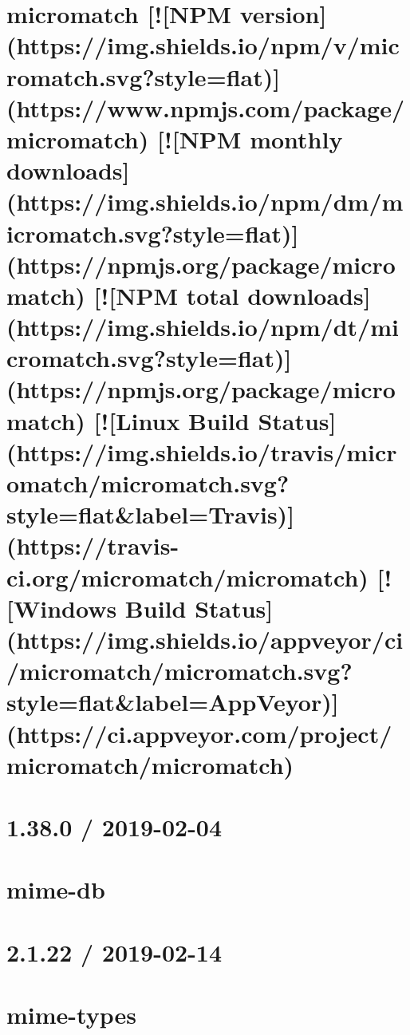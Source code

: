 \documentclass[twoside]{book}
\newcommand{\+}{\discretionary{\mbox{\scriptsize$\hookleftarrow$}}{}{}}
\begin{document}
\chapter{micromatch \mbox{[}!\mbox{[}N\+PM version\mbox{]}(https\+://img.shields.\+io/npm/v/micromatch.svg?style=flat)\mbox{]}(https\+://www.npmjs.\+com/package/micromatch) \mbox{[}!\mbox{[}N\+PM monthly downloads\mbox{]}(https\+://img.shields.\+io/npm/dm/micromatch.svg?style=flat)\mbox{]}(https\+://npmjs.org/package/micromatch) \mbox{[}!\mbox{[}N\+PM total downloads\mbox{]}(https\+://img.shields.\+io/npm/dt/micromatch.svg?style=flat)\mbox{]}(https\+://npmjs.org/package/micromatch) \mbox{[}!\mbox{[}Linux Build Status\mbox{]}(https\+://img.shields.\+io/travis/micromatch/micromatch.svg?style=flat\&label=Travis)\mbox{]}(https\+://travis-\/ci.org/micromatch/micromatch) \mbox{[}!\mbox{[}Windows Build Status\mbox{]}(https\+://img.shields.\+io/appveyor/ci/micromatch/micromatch.svg?style=flat\&label=App\+Veyor)\mbox{]}(https\+://ci.appveyor.\+com/project/micromatch/micromatch)}
\label{md_dsmacc_vis_degree_node_modules_micromatch_README}

\chapter{1.38.0 / 2019-\/02-\/04}
\label{md_dsmacc_vis_degree_node_modules_mime-db_HISTORY}

\chapter{mime-\/db}
\label{md_dsmacc_vis_degree_node_modules_mime-db_README}

\chapter{2.1.22 / 2019-\/02-\/14}
\label{md_dsmacc_vis_degree_node_modules_mime-types_HISTORY}

\chapter{mime-\/types}
\label{md_dsmacc_vis_degree_node_modules_mime-types_README}

\end{document}
